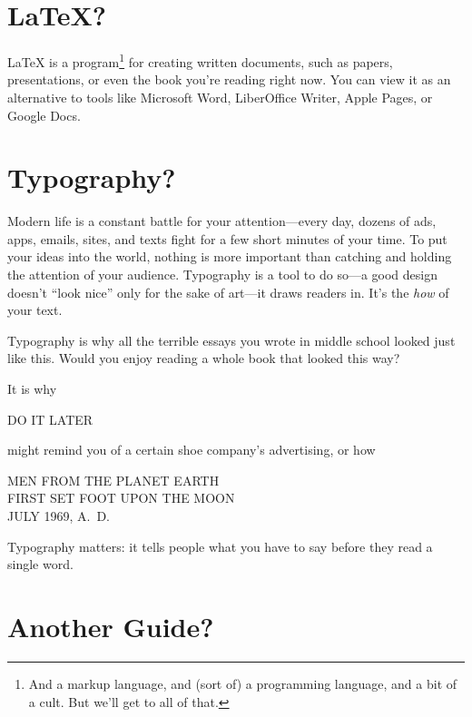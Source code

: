 \chapter{\texorpdfstring{\LaTeX}{LaTeX}?}

\LaTeX{} is a program\footnote{And a markup language,
and (sort of) a programming language, and a bit of a cult.
But we'll get to all of that.}
for creating written documents, such as papers, presentations,
or even the book you're reading right now.
You can view it as an alternative to tools like Microsoft Word,
LiberOffice Writer, Apple Pages, or Google Docs.

\chapter{Typography?}

Modern life is a constant battle for your attention---every day,
dozens of ads, apps, emails, sites, and texts fight
for a few short minutes of your time.
To put your ideas into the world,
nothing is more important than catching and holding
the attention of your audience.
Typography is a tool to do so---a good design doesn't ``look nice''
only for the sake of art---it draws readers in.\punckern{}
It's the \emph{how} of your text.

\begin{adjustwidth}{1.5em}{0pt}
\fontsize{12pt}{24pt}\selectfont\raggedright
\noindent Typography is why all the terrible essays you wrote in middle school
looked just like this.
Would you enjoy reading a whole book that looked this way?
\end{adjustwidth}
\bigskip

\noindent It is why
\bigskip

{\Large DO IT LATER}
\bigskip

\noindent might remind you of a certain shoe company's advertising,
or how

\begin{center}
\noindent MEN FROM THE PLANET EARTH \\
FIRST SET FOOT UPON THE MOON \\
JULY 1969, A.~D.
\end{center}

\noindent Typography matters: it tells people
what you have to say before they read a single word.

\chapter{Another Guide?}

